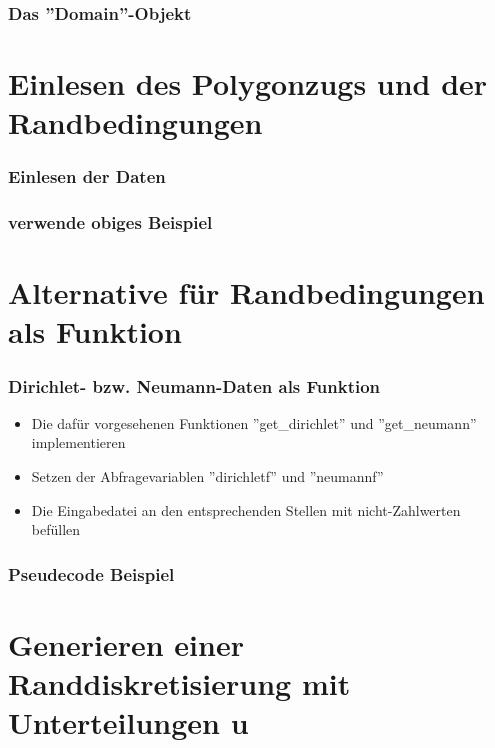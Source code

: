 \documentclass{beamer}
\begin{document}
\begin{frame}[fragile]
	\frametitle{Das ''Domain''-Objekt}
	
\end{frame}



\section{Einlesen des Polygonzugs und der Randbedingungen}

\begin{frame}[fragile]
	\frametitle{Einlesen der Daten}
	
\end{frame}

\begin{frame}
	\frametitle{verwende obiges Beispiel}
\end{frame}



\section{Alternative f\"ur Randbedingungen als Funktion}

\begin{frame}
	\frametitle{Dirichlet- bzw. Neumann-Daten als Funktion}
	\begin{itemize}
		\item Die daf\"ur vorgesehenen Funktionen ''get\_dirichlet''  und ''get\_neumann''  implementieren
		\item Setzen der Abfragevariablen ''dirichletf'' und ''neumannf''
		\item Die Eingabedatei an den entsprechenden Stellen mit nicht-Zahlwerten bef\"ullen
	\end{itemize}
\end{frame}


\begin{frame}
	\frametitle{Pseudecode Beispiel}
	
\end{frame}



\section{Generieren einer Randdiskretisierung mit Unterteilungen u}
\end{document}

